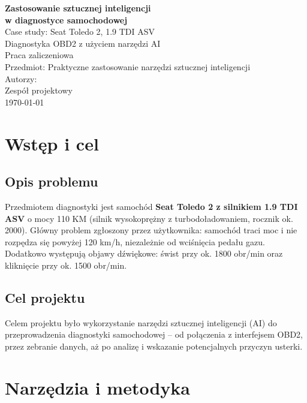 \documentclass[12pt,a4paper]{article}
\begin{document}
\begin{titlepage}
\centering
\vspace*{3cm}
{\Huge \textbf{Zastosowanie sztucznej inteligencji\\[0.3cm]
w diagnostyce samochodowej}}\\[1.5cm]
{\Large Case study: Seat Toledo 2, 1.9 TDI ASV}\\[1cm]
{\large Diagnostyka OBD2 z użyciem narzędzi AI}\\[2cm]

\vfill
{\large Praca zaliczeniowa}\\[0.3cm]
{\large Przedmiot: Praktyczne zastosowanie narzędzi sztucznej inteligencji}\\[2cm]

{\large Autorzy:}\\
{\large Zespół projektowy}\\[0.5cm]
{\large \today}
\end{titlepage}

\tableofcontents
\newpage

\section{Wstęp i cel}

\subsection{Opis problemu}

Przedmiotem diagnostyki jest samochód \textbf{Seat Toledo 2 z silnikiem 1.9 TDI ASV}
o mocy 110 KM (silnik wysokoprężny z turbodoładowaniem, rocznik ok. 2000).
Główny problem zgłoszony przez użytkownika: samochód traci moc i nie rozpędza się
powyżej 120 km/h, niezależnie od wciśnięcia pedału gazu. Dodatkowo występują
objawy dźwiękowe: świst przy ok. 1800 obr/min oraz kliknięcie przy ok. 1500 obr/min.

\subsection{Cel projektu}

Celem projektu było wykorzystanie narzędzi sztucznej inteligencji (AI) do
przeprowadzenia diagnostyki samochodowej – od połączenia z interfejsem OBD2,
przez zebranie danych, aż po analizę i wskazanie potencjalnych przyczyn usterki.

\section{Narzędzia i metodyka}
\end{document}
